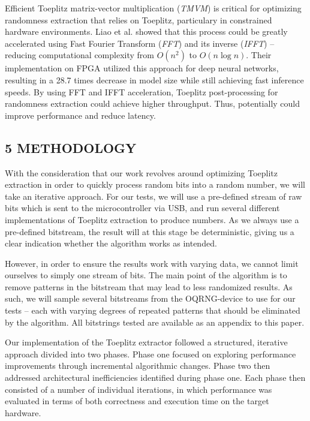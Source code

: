 \documentclass{sigchi}
\begin{document}
Efficient Toeplitz matrix-vector multiplication (\emph{TMVM}) is critical for optimizing randomness extraction that relies on Toeplitz, particulary in constrained hardware environments. Liao et al. \cite{liao} showed that this process could be greatly accelerated using Fast Fourier Transform (\emph{FFT}) and its inverse (\emph{IFFT}) -- reducing computational complexity from \(O(n^2)\) to \(O(n \log n)\). Their implementation on FPGA utilized this approach for deep neural networks, resulting in a 28.7 times decrease in model size while still achieving fast inference speeds. By using FFT and IFFT acceleration, Toeplitz post-processing for randomness extraction could achieve higher throughput. Thus, potentially could improve performance and reduce latency.

\subsection{5 METHODOLOGY}\label{methodology}

With the consideration that our work revolves around optimizing Toeplitz extraction in order to quickly process random bits into a random number, we will take an iterative approach. For our tests, we will use a pre-defined stream of raw bits which is sent to the microcontroller via USB, and run several different implementations of Toeplitz extraction to produce numbers. As we always use a pre-defined bitstream, the result will at this stage be deterministic, giving us a clear indication whether the algorithm works as intended.

However, in order to ensure the results work with varying data, we cannot limit ourselves to simply one stream of bits. The main point of the algorithm is to remove patterns in the bitstream that may lead to less randomized results. As such, we will sample several bitstreams from the OQRNG-device to use for our tests -- each with varying degrees of repeated patterns that should be eliminated by the algorithm. All bitstrings tested are available as an appendix to this paper.

Our implementation of the Toeplitz extractor followed a structured, iterative approach divided into two phases. Phase one focused on exploring performance improvements through incremental algorithmic changes. Phase two then addressed architectural inefficiencies identified during phase one. Each phase then consisted of a number of individual iterations, in which performance was evaluated in terms of both correctness and execution time on the target hardware.
\end{document}
